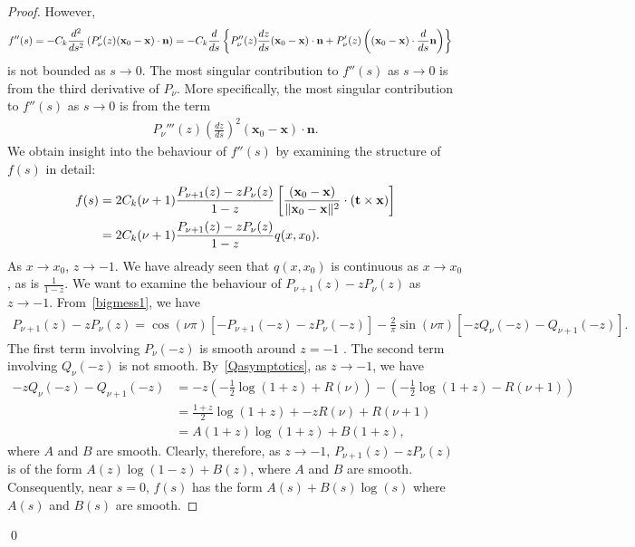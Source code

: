 \begin{proof}
However,
\begin{align*} 
  f''(s) &= -C_k \frac{d^2}{ds^2}\left( P'_\nu(z) 
  (\mathbf{x}_{0}-\mathbf{x}) \cdot \mathbf{n} \right) = 
    -C_{k}\frac{d}{ds}\left\{P''_{\nu}(z) \frac{dz}{ds}
    (\mathbf{x}_{0}-\mathbf{x})  \cdot \mathbf{n} + 
    P'_\nu(z)\left((\mathbf{x}_{0} -
    \mathbf{x}) \cdot \frac{d}{ds}\mathbf{n}\right)\right\}
\end{align*}
is not bounded as $s\rightarrow 0$. The most singular contribution to
$f''(s)$ as $s\rightarrow 0$ is from the third derivative of $P_{\nu}$.
More specifically, the most singular contribution to $f''(s)$ as
$s\rightarrow 0$ is from the term 
\begin{align*}
  P_{\nu}'''(z) \left(\frac{dz}{ds}\right)^2 
    (\mathbf{x}_{0}-\mathbf{x}) \cdot \mathbf{n}.
\end{align*}
We obtain insight into the behaviour of $f''(s)$ by examining the
structure of $f(s)$ in detail:
\begin{align*}
  f(s) &= 2C_k(\nu+1)\frac{P_{\nu+1}(z)-zP_{\nu}(z)}{1-z} \left[
  \frac{(\mathbf{x}_{0}-\mathbf{x})}{\|\mathbf{x}_{0}-\mathbf{x}\|^2}
  \cdot \left( \mathbf{t} \times \mathbf{x} \right)\right] \\
  &= 2C_k(\nu+1)\frac{P_{\nu+1}(z)-zP_{\nu}(z)}{1-z} q(x,x_0).
\end{align*}
As $x\rightarrow x_{0}$, $z \rightarrow -1.$ We have already seen that
$q(x,x_{0})$ is continuous  as
$x\rightarrow x_0$, as is $\frac{1}{1-z}$.  We want to examine the
behaviour of $P_{\nu+1}(z) - zP_{\nu}(z)$ as $z\rightarrow -1$.
From~\eqref{bigmess1}, we have
\begin{align*}
  P_{\nu+1}(z)-zP_{\nu}(z)
  = \cos(\nu \pi)\left[-P_{\nu+1}(-z) - zP_{\nu}(-z) \right] 
  -\frac{2}{\pi}\sin(\nu \pi)\left[-zQ_{\nu}(-z) - Q_{\nu+1}(-z) \right].
\end{align*}
The first term involving $P_{\nu}(-z)$ is smooth around $z=-1$
.  The second term involving $Q_{\nu}(-z)$ is
not smooth.  By~\eqref{Qasymptotics}, as $z \rightarrow -1$, we have
\begin{align*}
  -zQ_{\nu}(-z) - Q_{\nu+1}(-z) &= -z\left(
    -\frac{1}{2}\log(1+z) + R(\nu)\right) - 
    \left(-\frac{1}{2}\log(1+z) - R(\nu+1)\right) \\
  &= \frac{1+z}{2}\log(1+z) + -zR(\nu) + R(\nu+1) \\
  &= A(1+z)\log(1+z) + B(1+z),
\end{align*}
where $A$ and $B$ are smooth.  Clearly, therefore, as $z\rightarrow -1$,
$P_{\nu+1}(z) -z P_{\nu}(z)$ is of the form $A(z) \log(1-z) + B(z)$,
where $A$ and $B$ are smooth.  Consequently, near $s=0$, $f(s)$ has the
form $A(s) + B(s) \log(s)$ where $A(s)$ and $B(s)$ are smooth.
\end{proof}
\qed

